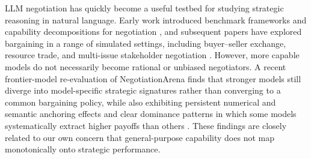 


LLM negotiation has quickly become a useful testbed for studying strategic reasoning in natural language.
Early work introduced benchmark frameworks and capability decompositions for negotiation \citep{bianchi_how_2024,kwon-etal-2024-llms}, and subsequent papers have explored bargaining in a range of simulated settings, including buyer--seller exchange, resource trade, and multi-issue stakeholder negotiation \citep{abdelnabi_cooperation_2024,davidson_evaluating_2024,chatterjee_agreemate_2024,noh_llms_2024}.
However, more capable models do not necessarily become rational or unbiased negotiators.
A recent frontier-model re-evaluation of NegotiationArena finds that stronger models still diverge into model-specific strategic signatures rather than converging to a common bargaining policy, while also exhibiting persistent numerical and semantic anchoring effects and clear dominance patterns in which some models systematically extract higher payoffs than others \citep{rios_illusion_2025}.
These findings are closely related to our own concern that general-purpose capability does not map monotonically onto strategic performance.


